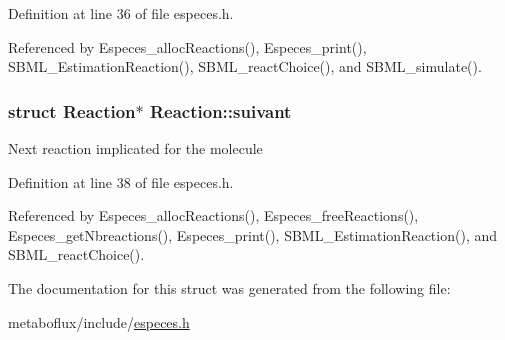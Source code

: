 Definition at line 36 of file especes.h.



Referenced by Especes\_\-allocReactions(), Especes\_\-print(), SBML\_\-EstimationReaction(), SBML\_\-reactChoice(), and SBML\_\-simulate().

\hypertarget{structReaction_ae0a12022d2d1cda2fe244b08a59be3d0}{
\subsubsection[{suivant}]{\setlength{\rightskip}{0pt plus 5cm}struct {\bf Reaction}$\ast$ {\bf Reaction::suivant}}}
\label{structReaction_ae0a12022d2d1cda2fe244b08a59be3d0}
Next reaction implicated for the molecule 

Definition at line 38 of file especes.h.



Referenced by Especes\_\-allocReactions(), Especes\_\-freeReactions(), Especes\_\-getNbreactions(), Especes\_\-print(), SBML\_\-EstimationReaction(), and SBML\_\-reactChoice().



The documentation for this struct was generated from the following file:\begin{DoxyCompactItemize}
\item 
metaboflux/include/\hyperlink{especes_8h}{especes.h}\end{DoxyCompactItemize}
